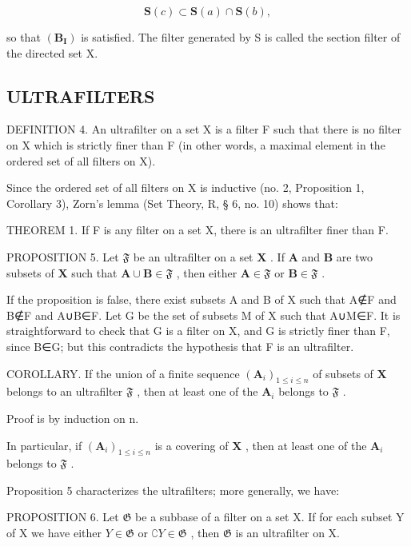 \[
\mathbf {S} (c) \subset \mathbf {S} (a) \cap \mathbf {S} (b),
\]

so that \((\mathbf{B}_{\mathbf{I}})\) is satisfied. The filter generated by S is called the section filter of the directed set X.

\subsection{ULTRAFILTERS}

DEFINITION 4. An ultrafilter on a set X is a filter F such that there is no filter on X which is strictly finer than F (in other words, a maximal element in the ordered set of all filters on X).

Since the ordered set of all filters on X is inductive (no. 2, Proposition 1, Corollary 3), Zorn's lemma (Set Theory, R, § 6, no. 10) shows that:

THEOREM 1. If F is any filter on a set X, there is an ultrafilter finer than F.

PROPOSITION 5. Let \(\mathfrak{F}\) be an ultrafilter on a set \(\mathbf{X}\) . If \(\mathbf{A}\) and \(\mathbf{B}\) are two subsets of \(\mathbf{X}\) such that \(\mathbf{A} \cup \mathbf{B} \in \mathfrak{F}\) , then either \(\mathbf{A} \in \mathfrak{F}\) or \(\mathbf{B} \in \mathfrak{F}\) .

If the proposition is false, there exist subsets A and B of X such that A∉F and B∉F and A∪B∈F. Let G be the set of subsets M of X such that A∪M∈F. It is straightforward to check that G is a filter on X, and G is strictly finer than F, since B∈G; but this contradicts the hypothesis that F is an ultrafilter.

COROLLARY. If the union of a finite sequence \((\mathbf{A}_i)_{1 \leqslant i \leqslant n}\) of subsets of \(\mathbf{X}\) belongs to an ultrafilter \(\mathfrak{F}\) , then at least one of the \(\mathbf{A}_i\) belongs to \(\mathfrak{F}\) .

Proof is by induction on n.

In particular, if \((\mathbf{A}_i)_{1\leqslant i\leqslant n}\) is a covering of \(\mathbf{X}\) , then at least one of the \(\mathbf{A}_i\) belongs to \(\mathfrak{F}\) .

Proposition 5 characterizes the ultrafilters; more generally, we have:

PROPOSITION 6. Let \(\mathfrak{G}\) be a subbase of a filter on a set X. If for each subset Y of X we have either \(Y \in \mathfrak{G}\) or \(\complement Y \in \mathfrak{G}\) , then \(\mathfrak{G}\) is an ultrafilter on X.

